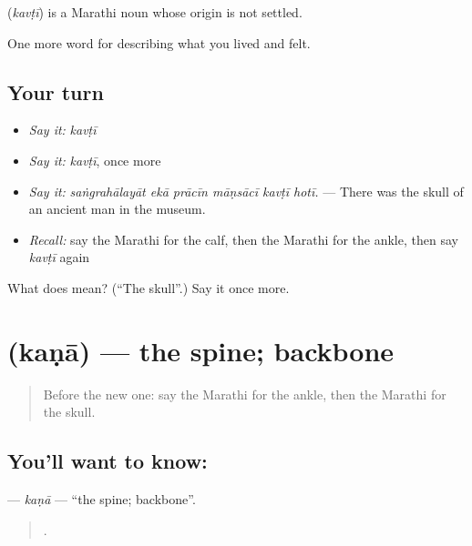 \begin{cousinweb}
\textbf{} (\emph{kavṭī}) is a Marathi noun whose origin is not settled.
\end{cousinweb}

\begin{grammarlens}[title={What you've built}]
One more word for describing what you lived and felt.
\end{grammarlens}

\subsection*{Your turn}
\begin{itemize}
\raggedright
  \item \emph{Say it:} \emph{kavṭī}
  \item \emph{Say it:} \emph{kavṭī}, once more
  \item \emph{Say it:} \emph{saṅgrahālayāt ekā prācīn māṇsācī kavṭī hotī.} — There was the skull of an ancient man in the museum.
  \item \emph{Recall:} say the Marathi for the calf, then the Marathi for the ankle, then say \emph{kavṭī} again
\end{itemize}

\begin{tcolorbox}[breakable,colback=teal!4,colframe=teal!35!black,title={Before you move on}]
What does  mean? (\textquotedblleft{}The skull\textquotedblright{}.) Say it once more.
\end{tcolorbox}
\section[\texorpdfstring{\mr{कणा} (kaṇā)}{कणा (kaṇā)}]{ (kaṇā) — the spine; backbone}

\label{lesson:MR-C478-kana}



\begin{quote}
Before the new one: say the Marathi for the ankle, then the Marathi for the skull.
\end{quote}

\subsection*{You'll want to know: }
\textbf{} — \emph{kaṇā} — \textquotedblleft{}the spine; backbone\textquotedblright{}.

\begin{quote}
     .
\end{quote}

